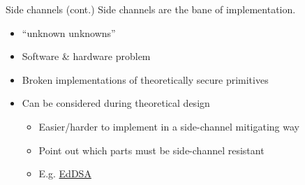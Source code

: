 \begin{frame}{Side channels (cont.)}
  Side channels are the bane of implementation.
  \begin{itemize}[<+(1)->]
    \item \enquote{unknown unknowns}
    \item Software \& hardware problem
    \item Broken implementations of theoretically secure primitives
    \item Can be considered during theoretical design
    \begin{itemize}
      \item Easier/harder to implement in a side-channel mitigating way
      \item Point out which parts must be side-channel resistant
      \item E.g. \href{https://ed25519.cr.yp.to/ed25519-20110926.pdf}{EdDSA}
    \end{itemize}
  \end{itemize}
\end{frame}


